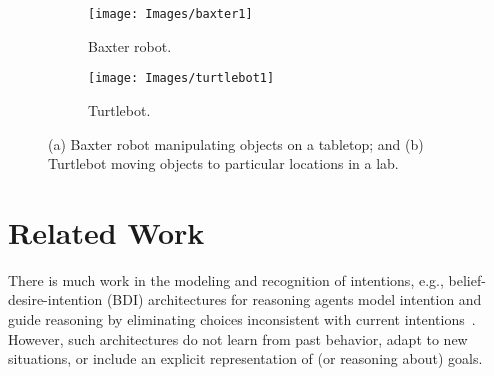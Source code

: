 \documentclass[letterpaper, 10 pt, conference]{ieeeconf}  %
\begin{document}
\begin{figure}[tb]
  \begin{center}
    \begin{subfigure}{0.23\textwidth}
      \texttt{[image: Images/baxter1]}
      \caption{Baxter robot.}
      \label{fig:example-baxter}
    \end{subfigure}
    \begin{subfigure}{0.17\textwidth}
      \texttt{[image: Images/turtlebot1]}
      \caption{Turtlebot.}
      \label{fig:example-turtlebot}
    \end{subfigure}
  \end{center}
  \vspace{-1em}
  \caption{(a) Baxter robot manipulating objects on a tabletop; and
    (b) Turtlebot moving objects to particular locations in a lab.}
  \label{fig:example-robots}
  \vspace{-1em}
\end{figure}




\section{Related Work}
\label{sec:relwork}
There is much work in the modeling and recognition of intentions,
e.g., belief-desire-intention (BDI) architectures for reasoning agents
model intention and guide reasoning by eliminating choices
inconsistent with current intentions~\cite{bratman1987intention}.
However, such architectures do not learn from past behavior, adapt to
new situations, or include an explicit representation of (or reasoning
about) goals.
 
\end{document}
